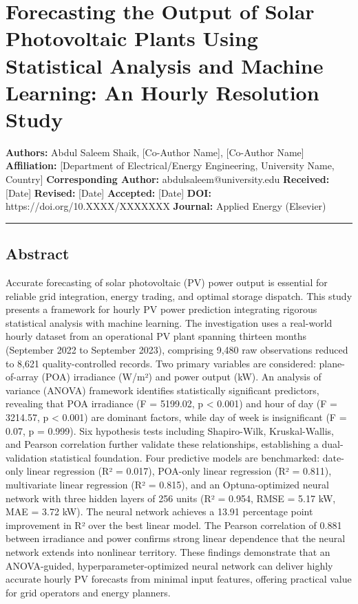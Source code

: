 \documentclass[
  11pt,
]{article}
\author{}
\date{}
\begin{document}
{
\setcounter{tocdepth}{3}
\tableofcontents
}
\section{Forecasting the Output of Solar Photovoltaic Plants Using
Statistical Analysis and Machine Learning: An Hourly Resolution
Study}\label{forecasting-the-output-of-solar-photovoltaic-plants-using-statistical-analysis-and-machine-learning-an-hourly-resolution-study}

\textbf{Authors:} Abdul Saleem Shaik, {[}Co-Author Name{]}, {[}Co-Author
Name{]} \textbf{Affiliation:} {[}Department of Electrical/Energy
Engineering, University Name, Country{]} \textbf{Corresponding Author:}
abdulsaleem@university.edu \textbf{Received:} {[}Date{]} \textbar{}
\textbf{Revised:} {[}Date{]} \textbar{} \textbf{Accepted:} {[}Date{]}
\textbf{DOI:} https://doi.org/10.XXXX/XXXXXXX \textbf{Journal:} Applied
Energy (Elsevier)

\begin{center}\rule{0.5\linewidth}{0.5pt}\end{center}

\subsection{Abstract}\label{abstract}

Accurate forecasting of solar photovoltaic (PV) power output is
essential for reliable grid integration, energy trading, and optimal
storage dispatch. This study presents a framework for hourly PV power
prediction integrating rigorous statistical analysis with machine
learning. The investigation uses a real-world hourly dataset from an
operational PV plant spanning thirteen months (September 2022 to
September 2023), comprising 9,480 raw observations reduced to 8,621
quality-controlled records. Two primary variables are considered:
plane-of-array (POA) irradiance (W/m²) and power output (kW). An
analysis of variance (ANOVA) framework identifies statistically
significant predictors, revealing that POA irradiance (F = 5199.02, p
\textless{} 0.001) and hour of day (F = 3214.57, p \textless{} 0.001)
are dominant factors, while day of week is insignificant (F = 0.07, p =
0.999). Six hypothesis tests including Shapiro-Wilk, Kruskal-Wallis, and
Pearson correlation further validate these relationships, establishing a
dual-validation statistical foundation. Four predictive models are
benchmarked: date-only linear regression (R² = 0.017), POA-only linear
regression (R² = 0.811), multivariate linear regression (R² = 0.815),
and an Optuna-optimized neural network with three hidden layers of 256
units (R² = 0.954, RMSE = 5.17 kW, MAE = 3.72 kW). The neural network
achieves a 13.91 percentage point improvement in R² over the best linear
model. The Pearson correlation of 0.881 between irradiance and power
confirms strong linear dependence that the neural network extends into
nonlinear territory. These findings demonstrate that an ANOVA-guided,
hyperparameter-optimized neural network can deliver highly accurate
hourly PV forecasts from minimal input features, offering practical
value for grid operators and energy planners.
\end{document}
